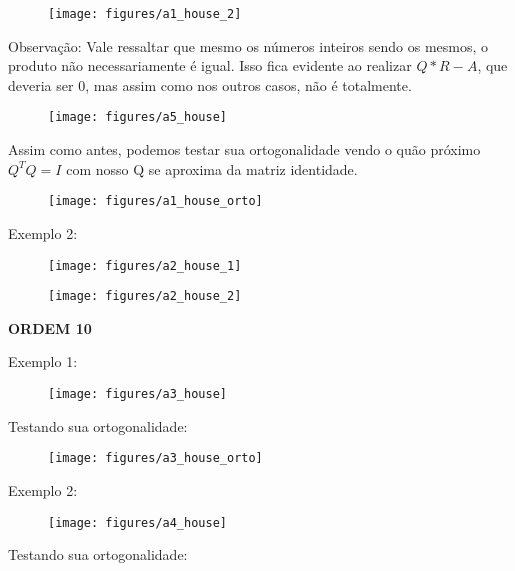 \documentclass[leqno]{article}
\numberwithin{equation}{section}
\begin{document}
	\begin{figure}[H]
		\centering
		\texttt{[image: figures/a1\_house\_2]}		
	\end{figure}

	Observação: Vale ressaltar que mesmo os números inteiros sendo os mesmos, o produto não necessariamente é igual. Isso fica evidente ao realizar $Q*R - A$, que deveria ser 0, mas assim como nos outros casos, não é totalmente.
	
	\begin{figure}[H]
		\centering
		\texttt{[image: figures/a5\_house]}		
	\end{figure}
	
	Assim como antes, podemos testar sua ortogonalidade vendo o quão próximo $Q^TQ = I$ com nosso Q se aproxima da matriz identidade.
	
	\begin{figure}[H]
		\centering
		\texttt{[image: figures/a1\_house\_orto]}		
	\end{figure}
	
	Exemplo 2:
	
	\begin{figure}[H]
		\centering
		\texttt{[image: figures/a2\_house\_1]}
	\end{figure}

	\begin{figure}[H]
		\centering
		\texttt{[image: figures/a2\_house\_2]}
	\end{figure}
	
	\newpage
	\textbf{{\large ORDEM 10}}
	
	Exemplo 1:
	
	\begin{figure}[H]
		\centering
		\texttt{[image: figures/a3\_house]}		
	\end{figure}
	
	
	Testando sua ortogonalidade:
	
	\begin{figure}[H]
		\centering
		\texttt{[image: figures/a3\_house\_orto]}		
	\end{figure}

	Exemplo 2:
	
	\begin{figure}[H]
		\centering
		\texttt{[image: figures/a4\_house]}		
	\end{figure}
	
	
	Testando sua ortogonalidade:
	
\end{document}
